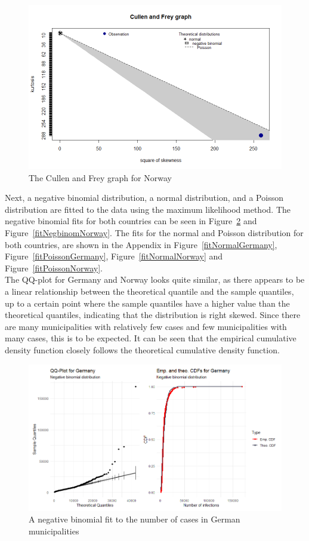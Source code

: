 \begin{figure}[H]
  \centering
  \includegraphics[width = \textwidth]{cf_norway.png}
  \caption{The Cullen and Frey graph for Norway}
  \label{cf_norway}
\end{figure}
Next, a negative binomial distribution, a normal distribution, and a Poisson distribution are fitted to the data using the maximum likelihood method. The negative binomial fits for both countries can be seen in Figure~\ref{fitNegbinomGermany} and Figure~\ref{fitNegbinomNorway}. The fits for the normal and Poisson distribution for both countries, are shown in the Appendix in Figure~\ref{fitNormalGermany}, Figure~\ref{fitPoissonGermany}, Figure~\ref{fitNormalNorway} and Figure~\ref{fitPoissonNorway}. \\
The QQ-plot for Germany and Norway looks quite similar, as there appears to be a linear relationship between the theoretical quantile and the sample quantiles, up to a certain point where the sample quantiles have a higher value than the theoretical quantiles, indicating that the distribution is right skewed. Since there are many municipalities with relatively few cases and few municipalities with many cases, this is to be expected. It can be seen that the empirical cumulative density function closely follows the theoretical cumulative density function.
\begin{figure}[H]
  \centering
  \includegraphics[width = \textwidth]{fit_nbinom_germany.png}
  \caption{A negative binomial fit to the number of cases in German municipalities}
  \label{fitNegbinomGermany}
\end{figure}
